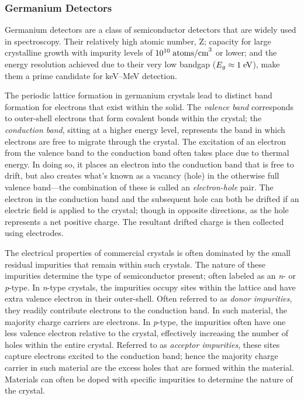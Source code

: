 \subsubsection{Germanium Detectors}

Germanium detectors are a class of semiconductor detectors that are widely used in \gray{} spectroscopy. Their relatively high atomic number, Z; capacity for large crystalline growth with impurity levels of $10^{10} \; \text{atoms/cm}^3$ or lower; and the energy resolution achieved due to their very low bandgap ($E_{g} \approx 1 \; \text{eV}$), make them a prime candidate for keV--MeV \gray{} detection. 

The periodic lattice formation in germanium crystals lead to distinct band formation for electrons that exist within the solid. The \textit{valence band} corresponds to outer-shell electrons that form covalent bonds within the crystal; the \textit{conduction band}, sitting at a higher energy level, represents the band in which electrons are free to migrate through the crystal. The excitation of an electron from the valence band to the conduction band often takes place due to thermal energy. In doing so, it places an electron into the conduction band that is free to drift, but also creates what's known as a vacancy (hole) in the otherwise full valence band---the combination of these is called an \textit{electron-hole} pair. The electron in the conduction band and the subsequent hole can both be drifted if an electric field is applied to the crystal; though in opposite directions, as the hole represents a net positive charge. The resultant drifted charge is then collected using electrodes.

The electrical properties of commercial crystals is often dominated by the small residual impurities that remain within such crystals. The nature of these impurities determine the type of semiconductor present; often labeled as an \textit{n}- or \textit{p}-type. In \textit{n}-type crystals, the impurities occupy sites within the lattice and have extra valence electron in their outer-shell. Often referred to as \textit{donor impurities}, they readily contribute electrons to the conduction band. In such material, the majority charge carriers are electrons. In \textit{p}-type, the impurities often have one less valence electron relative to the crystal, effectively increasing the number of holes within the entire crystal. Referred to as \textit{acceptor impurities}, these sites capture electrons excited to the conduction band; hence the majority charge carrier in such material are the excess holes that are formed within the material. Materials can often be doped with specific impurities to determine the nature of the crystal.


